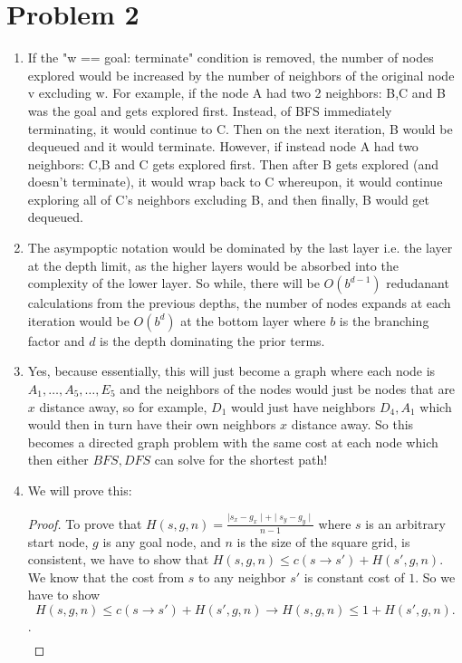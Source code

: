 \documentclass[a4paper]{article}
\begin{document}
\section{Problem 2}
\begin{enumerate}
  \item If the "w == goal: terminate" condition is removed, the number of nodes explored would be increased
    by the number of neighbors of the original node v excluding w. For example,
    if the node A had two 2 neighbors: B,C and B was the goal and gets explored first. Instead, of BFS immediately 
    terminating, it would continue to C. Then on the next iteration, B would be dequeued and it would terminate.
    However, if instead node A had two neighbors: C,B and C gets explored first. Then after B gets explored (and doesn't 
    terminate), it would wrap back to C whereupon, it would continue exploring all of C's neighbors excluding B, and then
    finally, B would get dequeued. 
  \item The asympoptic notation would be dominated by the last layer i.e. the layer at the depth limit, as the 
    higher layers would be absorbed into the complexity of the lower layer. So while, there will be $O(b^{d-1})$ 
    redudanant calculations from the previous depths, the number of nodes expands at each iteration would be
    $O(b^d)$ at the bottom layer where  $b$ is the branching factor and  $d$ is the depth dominating the prior terms.  
  \item Yes, because essentially, this will just become a graph where each node is $A_1,\ldots,A_5, \ldots, E_5$ and
    the neighbors of the nodes would just be nodes that are  $x$ distance away, so for example,  $D_1$ would just
    have neighbors $D_4,A_1$ which would then in turn have their own neighbors  $x$ distance away. So this becomes
    a directed graph problem with the same cost at each node which then either $BFS, DFS$ can solve for the shortest path!
  \item  We will prove this:
    \begin{proof}
      To prove that $H(s,g,n) = \frac{\mid s_x - g_x \mid + \mid s_y - g_y \mid  }{n-1}$ where $s$ is an arbitrary
      start node,  $g$ is any goal node, and  $n$ is the size of the square grid, is consistent, we have to show
      that  $H(s,g,n) \leq c(s \to s') + H(s',g,n)$. We know that the cost from  $s$ to any neighbor  $s'$ is constant
      cost of  $1$. So we have to show 
      \[
 H(s,g,n) \leq c(s \to s') + H(s',g,n) \to H(s,g,n) \leq 1 + H(s',g,n) 
      .\] . 
\begin{align*}

\end{align*}
\end{proof}
\end{enumerate}
\end{document}

